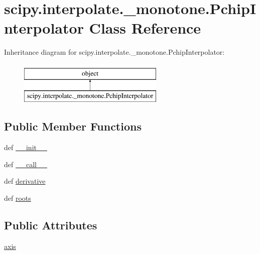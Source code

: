 \hypertarget{classscipy_1_1interpolate_1_1__monotone_1_1PchipInterpolator}{}\section{scipy.\+interpolate.\+\_\+monotone.\+Pchip\+Interpolator Class Reference}
\label{classscipy_1_1interpolate_1_1__monotone_1_1PchipInterpolator}
Inheritance diagram for scipy.\+interpolate.\+\_\+monotone.\+Pchip\+Interpolator\+:\begin{figure}[H]
\begin{center}
\leavevmode
\includegraphics[height=2.000000cm]{classscipy_1_1interpolate_1_1__monotone_1_1PchipInterpolator}
\end{center}
\end{figure}
\subsection*{Public Member Functions}
\begin{DoxyCompactItemize}
\item 
def \hyperlink{classscipy_1_1interpolate_1_1__monotone_1_1PchipInterpolator_a6b4721e0d8d26176ef866745f25f5b7c}{\+\_\+\+\_\+init\+\_\+\+\_\+}
\item 
def \hyperlink{classscipy_1_1interpolate_1_1__monotone_1_1PchipInterpolator_aef8748cbd4304ae2054e21211c262a0d}{\+\_\+\+\_\+call\+\_\+\+\_\+}
\item 
def \hyperlink{classscipy_1_1interpolate_1_1__monotone_1_1PchipInterpolator_a2556919bbf5812229c53509a0a5be622}{derivative}
\item 
def \hyperlink{classscipy_1_1interpolate_1_1__monotone_1_1PchipInterpolator_a4bed913b52261a714e63323a385d294b}{roots}
\end{DoxyCompactItemize}
\subsection*{Public Attributes}
\begin{DoxyCompactItemize}
\item 
\hyperlink{classscipy_1_1interpolate_1_1__monotone_1_1PchipInterpolator_af730ab388cf28121cdb63abe9d6d90f2}{axis}
\end{DoxyCompactItemize}


